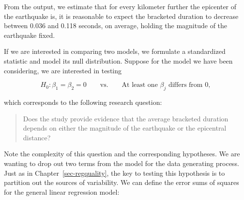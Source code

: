 \documentclass[
  letterpaper,
  DIV=11,
  numbers=noendperiod]{scrreprt}
\theoremstyle{definition}
\theoremstyle{definition}
\theoremstyle{plain}
\theoremstyle{remark}
\begin{document}
\begin{table}

\caption{\label{tbl-regextensions-ci}Summary the linear model fit
relating the bracketed duration at locations in Greece following an
earthquake with the magnitude of the event and the distance of the
location from the center of the earthquake.}


\end{table}%

From the output, we estimate that for every kilometer further the
epicenter of the earthquake is, it is reasonable to expect the bracketed
duration to decrease between 0.036 and 0.118 seconds, on average,
holding the magnitude of the earthquake fixed.

If we are interested in comparing two models, we formulate a
standardized statistic and model its null distribution. Suppose for the
model we have been considering, we are interested in testing

\[H_0: \beta_1 = \beta_2 = 0 \qquad \text{vs.} \qquad \text{At least one } \beta_j \text{ differs from 0},\]

which corresponds to the following research question:

\begin{quote}
Does the study provide evidence that the average bracketed duration
depends on either the magnitude of the earthquake or the epicentral
distance?
\end{quote}

Note the complexity of this question and the corresponding hypotheses.
We are wanting to drop out two terms from the model for the data
generating process. Just as in Chapter~\ref{sec-regquality}, the key to
testing this hypothesis is to partition out the sources of variability.
We can define the error sums of squares for the general linear
regression model:
\end{document}
